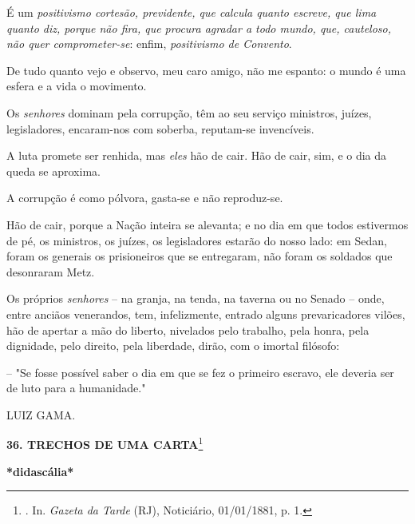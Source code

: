 É um \emph{positivismo cortesão, previdente, que calcula quanto escreve,
que lima quanto diz, porque não fira, que procura agradar a todo mundo,
que, cauteloso, não quer comprometer-se}: enfim, \emph{positivismo de
Convento}.

De tudo quanto vejo e observo, meu caro amigo, não me espanto: o mundo é
uma esfera e a vida o movimento.

Os \emph{senhores} dominam pela corrupção, têm ao seu serviço ministros,
juízes, legisladores, encaram-nos com soberba, reputam-se invencíveis.

A luta promete ser renhida, mas \emph{eles} hão de cair. Hão de cair,
sim, e o dia da queda se aproxima.

A corrupção é como pólvora, gasta-se e não reproduz-se.

Hão de cair, porque a Nação inteira se alevanta; e no dia em que todos
estivermos de pé, os ministros, os juízes, os legisladores estarão do
nosso lado: em Sedan, foram os generais os prisioneiros que se
entregaram, não foram os soldados que desonraram Metz.

Os próprios \emph{senhores} -- na granja, na tenda, na taverna ou no
Senado -- onde, entre anciãos venerandos, tem, infelizmente, entrado
alguns prevaricadores vilões, hão de apertar a mão do liberto, nivelados
pelo trabalho, pela honra, pela dignidade, pelo direito, pela liberdade,
dirão, com o imortal filósofo:

-- "Se fosse possível saber o dia em que se fez o primeiro escravo, ele
deveria ser de luto para a humanidade."

LUIZ GAMA.

\textbf{36. TRECHOS DE UMA CARTA}\footnote{. In. \emph{Gazeta da Tarde}
  (RJ), Noticiário, 01/01/1881, p. 1.}

\textbf{*didascália*}

